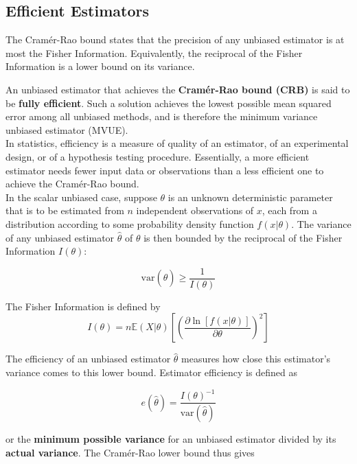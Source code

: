\documentclass{article}
\begin{document}
\subsection{Efficient Estimators}

\begin{definition}
    The Cramér-Rao bound states that the precision of any unbiased estimator is at most the Fisher Information. Equivalently, the reciprocal of the Fisher Information is a lower bound on its variance. 
\end{definition}

\noindent An unbiased estimator that achieves the \textbf{Cramér-Rao bound (CRB)} is said to be \textbf{fully efficient}. Such a solution achieves the lowest possible mean squared error among all unbiased methods, and is therefore the minimum variance unbiased estimator (MVUE). \\

\noindent In statistics, efficiency is a measure of quality of an estimator, of an experimental design, or of a hypothesis testing procedure. Essentially, a more efficient estimator needs fewer input data or observations than a less efficient one to achieve the Cramér-Rao bound. \\

\noindent In the scalar unbiased case, suppose $\theta$ is an unknown deterministic parameter that is to be estimated from $n$ independent observations of $x$, each from a distribution according to some probability density function $f(x\vert\theta)$. The variance of any unbiased estimator $\hat{\theta}$ of $\theta$ is then bounded by the reciprocal of the Fisher Information $I(\theta)$:

\[
    \text{var}(\hat{\theta}) \geq \frac{1}{I(\theta)} 
\]
\begin{definition}
    The Fisher Information is defined by 
\[
    I(\theta) = n \mathbb{E}(X\vert\theta)\left[\left( \frac{\partial \ln [f(x\vert\theta)]}{\partial\theta}\right)^{2}\right]
\]
\end{definition}

\noindent The efficiency of an unbiased estimator $\hat{\theta}$ measures how close this estimator's variance comes to this lower bound. Estimator efficiency is defined as 

\[
    e(\hat{\theta}) = \frac{I(\theta)^{-1}}{\text{var}(\hat{\theta})}
\]

\noindent or the \textbf{minimum possible variance} for an unbiased estimator divided by its \textbf{actual variance}. The Cramér-Rao lower bound thus gives 
\end{document}
